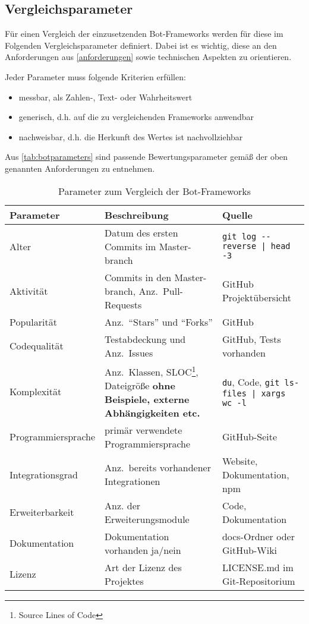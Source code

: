 
\subsection{Vergleichsparameter}
Für einen Vergleich der einzusetzenden Bot-Frameworks werden für diese im Folgenden Vergleichsparameter definiert. Dabei ist es wichtig, diese an den Anforderungen aus \autoref{anforderungen} sowie technischen Aspekten zu orientieren.

Jeder Parameter muss folgende Kriterien erfüllen:

\begin{itemize}
    \item messbar, als Zahlen-, Text- oder Wahrheitswert
    \item generisch, d.h. auf die zu vergleichenden Frameworks anwendbar
    \item nachweisbar, d.h. die Herkunft des Wertes ist nachvollziehbar
\end{itemize}

Aus \autoref{tab:botparameters} sind passende Bewertungsparameter gemäß der oben genannten Anforderungen zu entnehmen.

\begin{table}[htbp]
    \begin{tabularx}{\textwidth}{|l|X|p{6cm}|}
   \hline
   \textbf{Parameter} & \textbf{Beschreibung} & \textbf{Quelle} \\
   \hline
   Alter & Datum des ersten Commits im Master-branch & \verb+git log --reverse | head -3+\\
   \hline
   Aktivität & Commits in den Master-branch, Anz.\ Pull-Requests & GitHub Projektübersicht \\
   \hline
   Popularität & Anz.\ \enquote{Stars} und \enquote{Forks} & GitHub \\
    \hline
   Codequalität & Testabdeckung und Anz.\ Issues & GitHub, Tests vorhanden \\
   \hline
   Komplexität & Anz.\ Klassen, SLOC\footnote{Source Lines of Code}, Dateigröße \textbf{ohne Beispiele, externe Abhängigkeiten etc.} & \verb+du+, Code, \verb+git ls-files | xargs wc -l+ \\
   \hline
   Programmiersprache & primär verwendete Programmiersprache & GitHub-Seite \\
   \hline
   Integrationsgrad & Anz.\ bereits vorhandener Integrationen & Website, Dokumentation, npm \\
   \hline
   Erweiterbarkeit & Anz. der Erweiterungsmodule & Code, Dokumentation \\
   \hline
   Dokumentation & Dokumentation vorhanden ja/nein & docs-Ordner oder GitHub-Wiki \\
   \hline
   Lizenz & Art der Lizenz des Projektes & LICENSE.md im Git-Repositorium \\
   \hline
\end{tabularx}
\caption{Parameter zum Vergleich der Bot-Frameworks}
\label{tab:botparameters}
\end{table}

